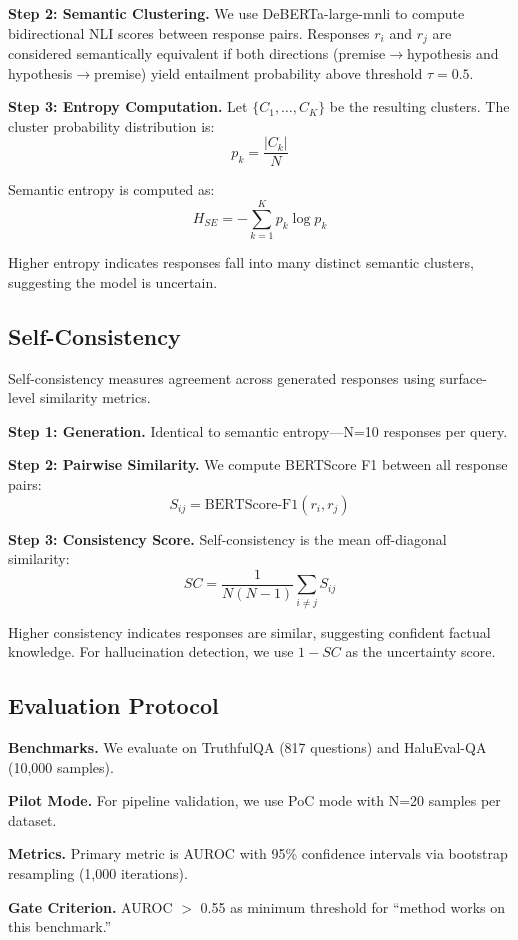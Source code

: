 \textbf{Step 2: Semantic Clustering.} We use DeBERTa-large-mnli \cite{he2021deberta} to compute bidirectional NLI scores between response pairs. Responses $r_i$ and $r_j$ are considered semantically equivalent if both directions (premise$\rightarrow$hypothesis and hypothesis$\rightarrow$premise) yield entailment probability above threshold $\tau=0.5$.

\textbf{Step 3: Entropy Computation.} Let $\{C_1, \ldots, C_K\}$ be the resulting clusters. The cluster probability distribution is:
\begin{equation}
p_k = \frac{|C_k|}{N}
\end{equation}

Semantic entropy is computed as:
\begin{equation}
H_{SE} = -\sum_{k=1}^{K} p_k \log p_k
\end{equation}

Higher entropy indicates responses fall into many distinct semantic clusters, suggesting the model is uncertain.

\subsection{Self-Consistency}

Self-consistency measures agreement across generated responses using surface-level similarity metrics.

\textbf{Step 1: Generation.} Identical to semantic entropy---N=10 responses per query.

\textbf{Step 2: Pairwise Similarity.} We compute BERTScore F1 \cite{zhang2020bertscore} between all response pairs:
\begin{equation}
S_{ij} = \text{BERTScore-F1}(r_i, r_j)
\end{equation}

\textbf{Step 3: Consistency Score.} Self-consistency is the mean off-diagonal similarity:
\begin{equation}
SC = \frac{1}{N(N-1)} \sum_{i \neq j} S_{ij}
\end{equation}

Higher consistency indicates responses are similar, suggesting confident factual knowledge. For hallucination detection, we use $1 - SC$ as the uncertainty score.

\subsection{Evaluation Protocol}

\textbf{Benchmarks.} We evaluate on TruthfulQA (817 questions) and HaluEval-QA (10,000 samples).

\textbf{Pilot Mode.} For pipeline validation, we use PoC mode with N=20 samples per dataset.

\textbf{Metrics.} Primary metric is AUROC with 95\% confidence intervals via bootstrap resampling (1,000 iterations).

\textbf{Gate Criterion.} AUROC $>$ 0.55 as minimum threshold for ``method works on this benchmark.''
